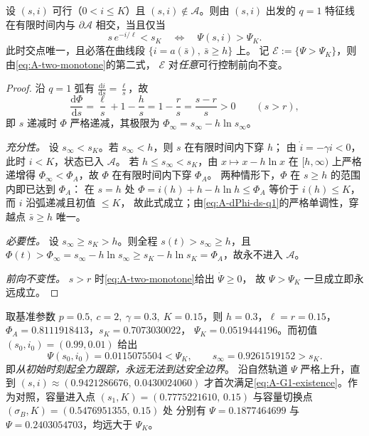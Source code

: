 \begin{lemma}[端点映射的存在性判据]
\label{lem:endpoint-exists}
设 $(s,i)$ 可行（$0<i\le K$）且 $(s,i)\notin\mathcal{A}$。则由 $(s,i)$ 出发的
$q=1$ 特征线在有限时间内与 $\partial\mathcal{A}$ 相交，当且仅当
\begin{equation}
  \boxed{\;s\,e^{-i/\ell}<s_K
  \quad\Longleftrightarrow\quad
  \Psi(s,i)>\Psi_K . \;}
  \label{eq:A-G1-existence}
\end{equation}
此时交点唯一，且必落在曲线段 $\{i=a(\bar s),\ \bar s\ge h\}$ 上。
记 $\mathcal{E}:=\{\Psi>\Psi_K\}$，则由\eqref{eq:A-two-monotone}的第二式，
$\mathcal{E}$ 对\emph{任意}可行控制前向不变。
\end{lemma}

\begin{proof}
沿 $q=1$ 弧有 $\frac{\mathrm{d}i}{\mathrm{d}s}=\frac{\ell}{s}$，故
\begin{equation}
  \frac{\mathrm{d}\Phi}{\mathrm{d}s}
  =\frac{\ell}{s}+1-\frac{h}{s}=1-\frac{r}{s}=\frac{s-r}{s}>0
  \qquad(s>r),
  \label{eq:A-dPhi-ds-q1}
\end{equation}
即 $s$ 递减时 $\Phi$ 严格递减，其极限为 $\Phi_\infty=s_\infty-h\ln s_\infty$。

\emph{充分性。} 设 $s_\infty<s_K$。若 $s_\infty<h$，则 $s$ 在有限时间内下穿 $h$；
由 $\dot i=-\gamma i<0$，此时 $i<K$，状态已入 $\mathcal{A}$。
若 $h\le s_\infty<s_K$，由 $x\mapsto x-h\ln x$ 在 $[h,\infty)$ 上严格递增得
$\Phi_\infty<\Phi_A$，故 $\Phi$ 在有限时间内下穿 $\Phi_A$。
两种情形下，$\Phi$ 在 $s\ge h$ 的范围内即已达到 $\Phi_A$：
在 $s=h$ 处 $\Phi=i(h)+h-h\ln h\le\Phi_A$ 等价于 $i(h)\le K$，而 $i$ 沿弧递减且初值 $\le K$，
故此式成立；由\eqref{eq:A-dPhi-ds-q1}的严格单调性，穿越点 $\bar s\ge h$ 唯一。

\emph{必要性。} 设 $s_\infty\ge s_K>h$。则全程 $s(t)>s_\infty\ge h$，且
$\Phi(t)>\Phi_\infty=s_\infty-h\ln s_\infty\ge s_K-h\ln s_K=\Phi_A$，故永不进入 $\mathcal{A}$。

\emph{前向不变性。} $s>r$ 时\eqref{eq:A-two-monotone}给出 $\dot\Psi\ge0$，
故 $\Psi>\Psi_K$ 一旦成立即永远成立。
\end{proof}

\begin{remark}
\label{rem:G1-fails-at-t0}
取基准参数 $p=0.5,\ c=2,\ \gamma=0.3,\ K=0.15$，则
$h=0.3$，$\ell=r=0.15$，$\Phi_A=0.8111918413$，$s_K=0.7073030022$，
$\Psi_K=0.0519444196$。而初值 $(s_0,i_0)=(0.99,0.01)$ 给出
\[
  \Psi(s_0,i_0)=0.0115075504<\Psi_K,
  \qquad
  s_\infty=0.9261519152>s_K .
\]
即\emph{从初始时刻起全力跟踪，永远无法到达安全边界}。
沿自然轨道 $\Psi$ 严格上升，直到 $(s,i)\approx(0.9421286676,\,0.0430024060)$
才首次满足\eqref{eq:A-G1-existence}。作为对照，容量进入点
$(s_1,K)=(0.7775221610,\,0.15)$ 与容量切换点 $(\sigma_B,K)=(0.5476951355,\,0.15)$ 处
分别有 $\Psi=0.1877464699$ 与 $\Psi=0.2403054703$，均远大于 $\Psi_K$。
\end{remark}

